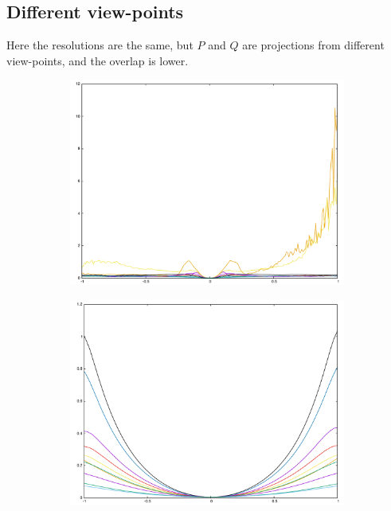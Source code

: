 {\subsection{Different view-points}
Here the resolutions are the same, but $P$ and $Q$ are projections from different view-points, and the overlap is lower.

\begin{figure}[H]
\begin{subfigure}{.33\textwidth}
	\includegraphics[width=\linewidth]{fig/ajherr/t2/L_chi.pdf}
\end{subfigure}%
\begin{subfigure}{.33\textwidth}
	\includegraphics[width=\linewidth]{fig/ajherr/t2/M_chi.pdf}

\end{subfigure}
\end{figure}}
